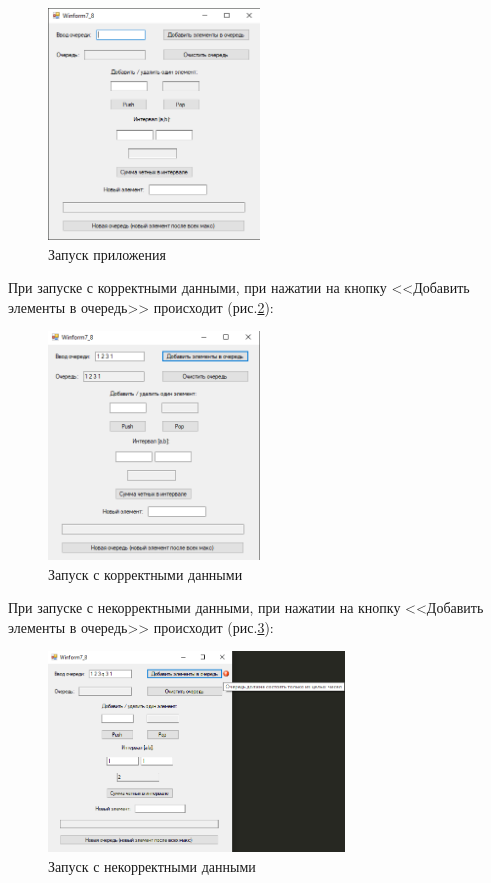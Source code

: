 \begin{figure}[!h]
    \centering
    \includegraphics[width = 0.5\textwidth]{images/Task7/Start.png}
    \caption{Запуск приложения}
    \label{fig:StartForm7}
\end{figure}

При запуске с корректными данными, при нажатии на кнопку <<Добавить элементы в очередь>> происходит (рис.\ref{fig:WorkForm7}):

\newpage

\begin{figure}[!h]
    \centering
    \includegraphics[width = 0.5\textwidth]{images/Task7/WorkAddQueue.png}
    \caption{Запуск с корректными данными}
    \label{fig:WorkForm7}
\end{figure}

При запуске с некорректными данными, при нажатии на кнопку <<Добавить элементы в очередь>> происходит  (рис.\ref{fig:BadInputNotIntForm7}):

\begin{figure}[!h]
    \centering
    \includegraphics[width = 0.7\textwidth]{images/Task7/BadInputAddNotInt.png}
    \caption{Запуск с некорректными данными}
    \label{fig:BadInputNotIntForm7}
\end{figure}

